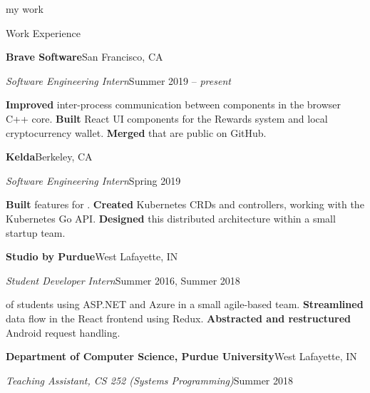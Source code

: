 \begin{minipage}[t]{0.665\textwidth}
  {\Huge my work \phantom{me}}

  \vspace{10pt}

  {\sectionfont Work Experience}

  \vspace{5pt}
  \textbf{Brave Software}\quad{}\hfill San Francisco, CA
  \begin{adjustwidth}{10pt}{}
    \emph{Software Engineering Intern}\hfill Summer 2019 -- \emph{present}

    \textbf{Improved} inter-process communication between components in the browser C++ core.
    \textbf{Built} React UI components for the Rewards system and local cryptocurrency wallet.
    \textbf{Merged}  that are public on GitHub.
  \end{adjustwidth}

  \vspace{5pt}
  \textbf{Kelda}\quad{}\hfill Berkeley, CA
  \begin{adjustwidth}{10pt}{}
    \emph{Software Engineering Intern}\hfill Spring 2019

    \textbf{Built} features for .
    \textbf{Created} Kubernetes CRDs and controllers, working with the Kubernetes Go API.
    \textbf{Designed} this distributed architecture within a small startup team.
  \end{adjustwidth}

  \vspace{5pt}
  \textbf{Studio by Purdue}\hfill West Lafayette, IN
  \begin{adjustwidth}{10pt}{}
    \emph{Student Developer Intern}\hfill Summer 2016, Summer 2018

     of students using ASP.NET and Azure in a small agile-based team.
    \textbf{Streamlined} data flow in the React frontend using Redux.
    \textbf{Abstracted and restructured} Android request handling.
  \end{adjustwidth}

  \vspace{5pt}
  \textbf{Department of Computer Science, Purdue University}\hfill West Lafayette, IN
  \begin{adjustwidth}{10pt}{}
    \emph{Teaching Assistant, CS 252 (Systems Programming)}\hfill Summer 2018


\end{adjustwidth}
\end{minipage}

